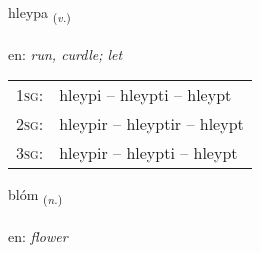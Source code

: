 \documentclass[frontgrid, backgrid]{flacards}\usepackage[]{graphicx}\usepackage[]{color}
\begin{document}
\renewcommand{\blhead}{\vskip5pt {\small\bfseries\footnotesize Sagnorð | Verb }}
\renewcommand{\bcfoot}{\vskip5pt \hspace{2pt}{\small\bfseries\footnotesize 2K}}


{hleypa \small{\textsubscript{(\textit{v.})}} \\[1ex] %
\textphonetic{[l̥eiːpa]} \\
en: \emph{run, curdle; let} \\  [2ex]
\renewcommand*{\arraystretch}{0.8}
\begin{tabular}{p{1cm}l}
\textsc{1sg}: & hleypi -- hleypti -- hleypt \\ 
\textsc{2sg}: & hleypir -- hleyptir -- hleypt \\ 
\textsc{3sg}: & hleypir -- hleypti -- hleypt \\ 
\end{tabular}
}

\renewcommand{\flhead}{\vskip5pt \fboxsep=0pt {\small\bfseries\footnotesize Nafnorð | Noun}}
\renewcommand{\fcfoot}{\vskip5pt \fboxsep=0pt \hspace{2pt}{\small\bfseries\footnotesize 2K}}

\renewcommand{\blhead}{\vskip5pt {\small\bfseries\footnotesize Nafnorð | Noun }}
\renewcommand{\bcfoot}{\vskip5pt \hspace{2pt}{\small\bfseries\footnotesize 2K}}


{blóm \small{\textsubscript{(\textit{n.})}} \\[1ex] %
\textphonetic{[plouːm]} \\
en: \emph{flower} \\  [2ex]
\renewcommand*{\arraystretch}{0.8}
}

\renewcommand{\flhead}{\vskip5pt \fboxsep=0pt {\small\bfseries\footnotesize Sagnorð | Verb}}
\renewcommand{\fcfoot}{\vskip5pt \fboxsep=0pt \hspace{2pt}{\small\bfseries\footnotesize 2K}}
\end{document}
